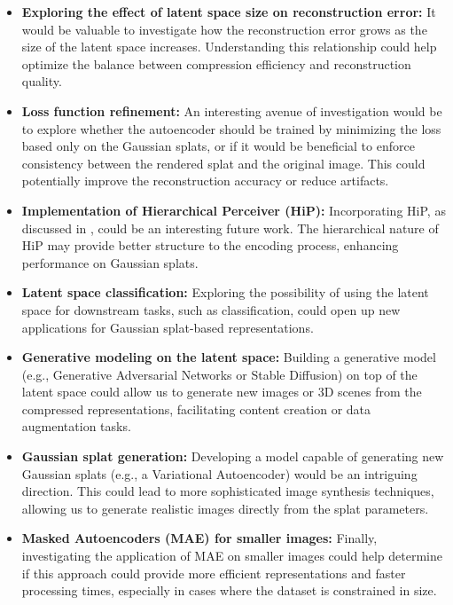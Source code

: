 \begin{itemize}
    \item \textbf{Exploring the effect of latent space size on reconstruction error:} It would be valuable to investigate how the reconstruction error grows as the size of the latent space increases. Understanding this relationship could help optimize the balance between compression efficiency and reconstruction quality.
    
    \item \textbf{Loss function refinement:} An interesting avenue of investigation would be to explore whether the autoencoder should be trained by minimizing the loss based only on the Gaussian splats, or if it would be beneficial to enforce consistency between the rendered splat and the original image. This could potentially improve the reconstruction accuracy or reduce artifacts.
    
    \item \textbf{Implementation of Hierarchical Perceiver (HiP):} Incorporating HiP, as discussed in \cite{carreira2022hierarchicalp}, could be an interesting future work. The hierarchical nature of HiP may provide better structure to the encoding process, enhancing performance on Gaussian splats.
    
    \item \textbf{Latent space classification:} Exploring the possibility of using the latent space for downstream tasks, such as classification, could open up new applications for Gaussian splat-based representations.
    
    \item \textbf{Generative modeling on the latent space:} Building a generative model (e.g., Generative Adversarial Networks or Stable Diffusion) on top of the latent space could allow us to generate new images or 3D scenes from the compressed representations, facilitating content creation or data augmentation tasks.
    
    \item \textbf{Gaussian splat generation:} Developing a model capable of generating new Gaussian splats (e.g., a Variational Autoencoder) would be an intriguing direction. This could lead to more sophisticated image synthesis techniques, allowing us to generate realistic images directly from the splat parameters.
    
    \item \textbf{Masked Autoencoders (MAE) for smaller images:} Finally, investigating the application of MAE on smaller images could help determine if this approach could provide more efficient representations and faster processing times, especially in cases where the dataset is constrained in size.
\end{itemize}
